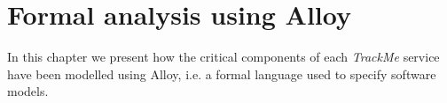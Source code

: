 \chapter{Formal analysis using Alloy}

    In this chapter we present how the critical components of each \emph{TrackMe} service have been modelled using Alloy, i.e. a formal language used to specify software models.
    
    
    
    
    